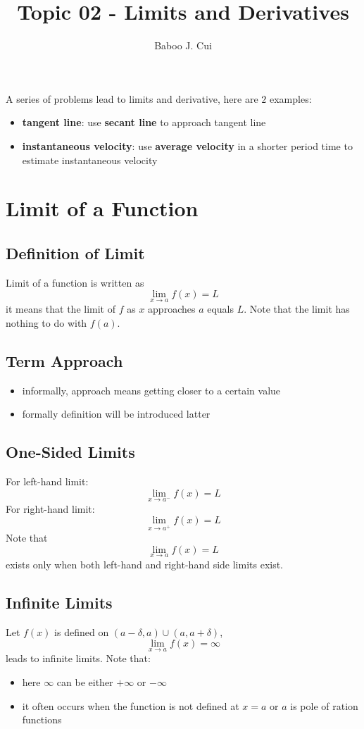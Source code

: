 \documentclass[10pt,a4paper,oneside]{article}
\author{Baboo J. Cui}
\title{Topic 02 - Limits and Derivatives}
\begin{document}
\maketitle
\tableofcontents

\newpage

A series of problems lead to limits and derivative, here are $2$ examples:
\begin{itemize}
	\item \textbf{tangent line}: use \textbf{secant line} to approach tangent line
	\item \textbf{instantaneous velocity}: use \textbf{average velocity} in a shorter period time to estimate instantaneous velocity
\end{itemize}

\section{Limit of a Function}

\subsection {Definition of Limit}
Limit of a function is written as
\[
\lim _{x \rightarrow a} f(x) = L
\]
it means that the limit of $f$ as $x$ approaches $a$ equals $L$. Note that the limit has nothing to do with $f(a)$.

\subsection{Term Approach}
\begin{itemize}
	\item informally, approach means getting closer to a certain value
	\item formally definition will be introduced latter
\end{itemize}

\subsection{One-Sided Limits}
For left-hand limit:
\[
\lim _{x \rightarrow a^{-}} f(x) = L 
\]
For right-hand limit:
\[
\lim _{x \rightarrow a^{+}} f(x) = L 
\]
Note that
\[
\lim _{x \rightarrow a} f(x) = L 
\]
exists only when both left-hand and right-hand side limits exist.

\subsection{Infinite Limits}
Let $f(x)$ is defined on $(a-\delta, a) \cup (a,a+\delta)$,
\[
\lim _{x \rightarrow a} f(x) = \infty
\]
leads to infinite limits. Note that:
\begin{itemize}
	\item here $\infty$ can be either $+\infty$ or $-\infty$
	\item it often occurs when the function is not defined at $x = a$ or $a$ is pole of ration functions
\end{itemize}
\end{document}
